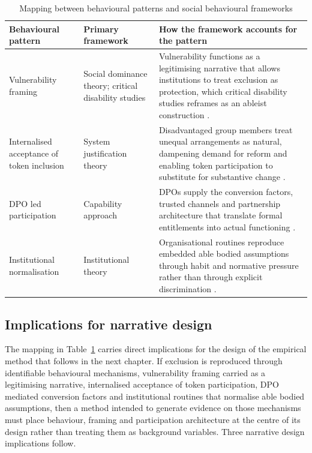 \documentclass[12pt,a4paper]{report}
\begin{document}
\begin{table}[H]
\centering
\small
\renewcommand{\arraystretch}{1.3}
\caption{Mapping between behavioural patterns and social behavioural frameworks}
\label{tab:mechanism-theory}
\begin{tabularx}{\textwidth}{>{\raggedright\arraybackslash}p{} >{\raggedright\arraybackslash}p{} >{\raggedright\arraybackslash}X}
\toprule
\textbf{Behavioural pattern} & \textbf{Primary framework} & \textbf{How the framework accounts for the pattern} \\
\midrule
Vulnerability framing
& Social dominance theory; critical disability studies
& Vulnerability functions as a legitimising narrative that allows institutions to treat exclusion as protection, which critical disability studies reframes as an ableist construction \cite{sidanius_pratto_1999_socdom,Murcott2025,oliver_1990_politics,stjernholm2025critical}. \\
\midrule
Internalised acceptance of token inclusion
& System justification theory
& Disadvantaged group members treat unequal arrangements as natural, dampening demand for reform and enabling token participation to substitute for substantive change \cite{jost_2003_decade,Akike2025,setijaningrum2024tokenism}. \\
\midrule
DPO led participation
& Capability approach
& DPOs supply the conversion factors, trusted channels and partnership architecture that translate formal entitlements into actual functioning \cite{sen_1999_development,ton2021agency,villeneuve2021pcep,rahatiningtyas2025yogyakarta}. \\
\midrule
Institutional normalisation
& Institutional theory
& Organisational routines reproduce embedded able bodied assumptions through habit and normative pressure rather than through explicit discrimination \cite{dimaggio_powell_1983_ironcage,brown2025massachusetts,gershon2021fema,lunga2019zimbabwe}. \\
\bottomrule
\end{tabularx}
\end{table}

\subsection{Implications for narrative design}
\label{sec:4-6-1-narrative-design-implications}
The mapping in Table~\ref{tab:mechanism-theory} carries direct implications for the design of the empirical method that follows in the next chapter. If exclusion is reproduced through identifiable behavioural mechanisms, vulnerability framing carried as a legitimising narrative, internalised acceptance of token participation, DPO mediated conversion factors and institutional routines that normalise able bodied assumptions, then a method intended to generate evidence on those mechanisms must place behaviour, framing and participation architecture at the centre of its design rather than treating them as background variables. Three narrative design implications follow.
\end{document}
